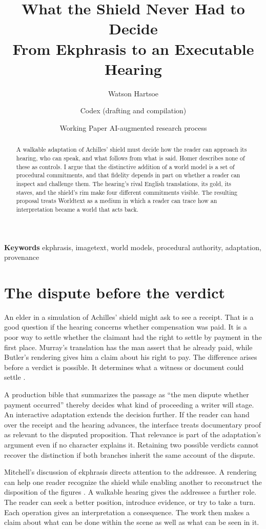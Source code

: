 \documentclass[11pt]{article}
\title{\Huge What the Shield Never Had to Decide\\[.3em]\large From Ekphrasis to an Executable Hearing}
\author{Watson Hartsoe \and Codex (drafting and compilation)}
\date{Working Paper \textbullet{} AI-augmented research process}
\begin{document}
\maketitle
\begin{abstract}
A walkable adaptation of Achilles' shield must decide how the reader can approach its hearing, who can speak, and what follows from what is said. Homer describes none of these as controls. I argue that the distinctive addition of a world model is a set of procedural commitments, and that fidelity depends in part on whether a reader can inspect and challenge them. The hearing's rival English translations, its gold, its staves, and the shield's rim make four different commitments visible. The resulting proposal treats Worldtext as a medium in which a reader can trace how an interpretation became a world that acts back.
\end{abstract}
\textbf{Keywords} ekphrasis, imagetext, world models, procedural authority, adaptation, provenance

\section{The dispute before the verdict}
An elder in a simulation of Achilles' shield might ask to see a receipt. That is a good question if the hearing concerns whether compensation was paid. It is a poor way to settle whether the claimant had the right to settle by payment in the first place. Murray's translation has the man assert that he already paid, while Butler's rendering gives him a claim about his right to pay. The difference arises before a verdict is possible. It determines what a witness or document could settle \cite{homerIliadMurray,homerIliadButler}.

A production bible that summarizes the passage as “the men dispute whether payment occurred” thereby decides what kind of proceeding a writer will stage. An interactive adaptation extends the decision further. If the reader can hand over the receipt and the hearing advances, the interface treats documentary proof as relevant to the disputed proposition. That relevance is part of the adaptation's argument even if no character explains it. Retaining two possible verdicts cannot recover the distinction if both branches inherit the same account of the dispute.

Mitchell's discussion of ekphrasis directs attention to the addressee. A rendering can help one reader recognize the shield while enabling another to reconstruct the disposition of the figures \cite{mitchell1994ekphrasis}. A walkable hearing gives the addressee a further role. The reader can seek a better position, introduce evidence, or try to take a turn. Each operation gives an interpretation a consequence. The work then makes a claim about what can be done within the scene as well as what can be seen in it.
\end{document}
